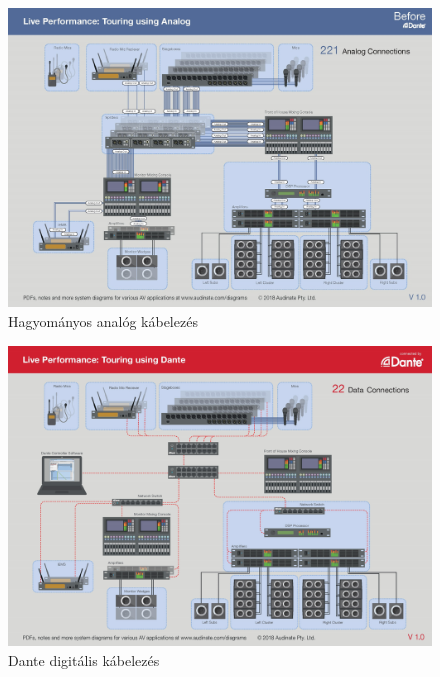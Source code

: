 \begin{figure}[H]
	\centering
	\includegraphics[width=\linewidth, keepaspectratio]{figures/live-analog.jpg}
	\caption{Hagyományos analóg kábelezés \cite{APPLICATIONDIAGRAMSFORDANTESYSTEMS}}\label{fig:live-analog}
\end{figure}
\begin{figure}[H]
	\centering
	\includegraphics[width=\linewidth, keepaspectratio]{figures/live-dante.jpg}
	\caption{Dante digitális kábelezés \cite{APPLICATIONDIAGRAMSFORDANTESYSTEMS}}\label{fig:live-dante}
\end{figure}

